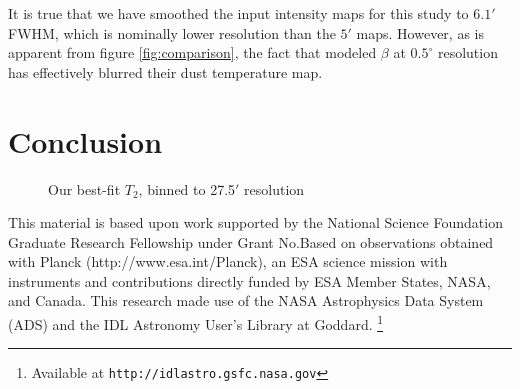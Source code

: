 \documentclass{emulateapj}
\begin{document}
It is true that we have smoothed the input intensity maps for this study 
to $6.1'$ FWHM, which is nominally lower resolution than the $5'$ 
\cite{planckdust} maps. However, as is apparent from figure 
\ref{fig:comparison}, the fact that \cite{planckdust} modeled $\beta$ at 
$0.5^{\circ}$ resolution has effectively blurred their dust temperature map.


\section{Conclusion}


\label{sec:conclusion}

\begin{figure*} [ht]
\begin{center}
\caption{Our best-fit $T_2$, binned to 27.5$'$ resolution}
\end{center}
\end{figure*}

This material is based upon work supported by the National Science Foundation 
Graduate Research Fellowship under Grant No.Based on observations obtained with
 Planck (http://www.esa.int/Planck), an ESA science mission with instruments 
and contributions directly funded by ESA Member States, NASA, and Canada. This 
research made use of the NASA Astrophysics Data System (ADS) and the IDL 
Astronomy User's Library at Goddard. \footnote{Available at 
\texttt{http://idlastro.gsfc.nasa.gov}}



\end{document}
